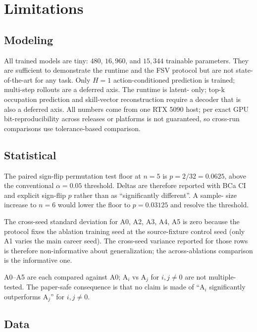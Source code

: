 \documentclass[10pt,twocolumn,letterpaper]{article}
\begin{document}
\section{Limitations}
\label{sec:limits}

\subsection{Modeling}

All trained models are tiny: $480$, $16{,}960$, and $15{,}344$
trainable parameters. They are sufficient to demonstrate the
runtime and the FSV protocol but are not state-of-the-art for any
task. Only $H{=}1$ action-conditioned prediction is trained;
multi-step rollouts are a deferred axis. The runtime is latent-
only; top-k occupation prediction and skill-vector reconstruction
require a decoder that is also a deferred axis. All numbers come
from one RTX 5090 host; per
\citep{pytorch2026reproducibility} exact GPU bit-reproducibility
across releases or platforms is not guaranteed, so cross-run
comparisons use tolerance-based comparison.

\subsection{Statistical}

The paired sign-flip permutation test floor at $n=5$ is
$p = 2/32 = 0.0625$, above the conventional $\alpha=0.05$
threshold. Deltas are therefore reported with BCa CI and explicit
sign-flip $p$ rather than as ``significantly different''. A sample-
size increase to $n=6$ would lower the floor to $p = 0.03125$ and
resolve the threshold.

The cross-seed standard deviation for A0, A2, A3, A4, A5 is zero
because the protocol fixes the ablation training seed at the
source-fixture control seed (only A1 varies the main career
seed). The cross-seed variance reported for those rows is
therefore non-informative about generalization; the
across-ablations comparison is the informative one.

A0--A5 are each compared against A0; A$_i$ vs A$_j$ for
$i,j \neq 0$ are not multiple-tested. The paper-safe consequence
is that no claim is made of ``A$_i$ significantly outperforms
A$_j$'' for $i,j \neq 0$.

\subsection{Data}
\end{document}

